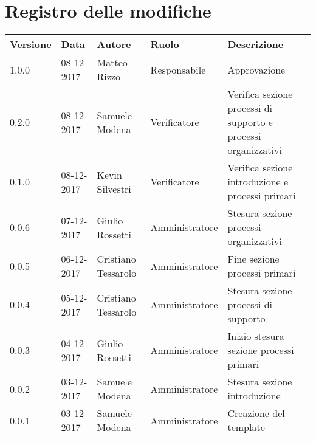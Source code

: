 \documentclass[./NormediProgetto.tex]{subfiles}
\begin{document}
\chapter*{Registro delle modifiche}
\setlength\LTleft{-22mm}
\begin{longtable}{|p{20mm}|p{20mm}|p{40mm}|p{30mm}|p{50mm}|}
	\hline
	\textbf{Versione} & \textbf{Data} & \textbf{Autore} & \textbf{Ruolo} & \textbf{Descrizione} \\ \hline 
		1.0.0 & 08-12-2017 & Matteo Rizzo & Responsabile & Approvazione\\ \hline
		0.2.0 & 08-12-2017 & Samuele Modena & Verificatore & Verifica sezione processi di supporto e processi organizzativi\\ \hline
		0.1.0 & 08-12-2017 & Kevin Silvestri & Verificatore & Verifica sezione introduzione e processi primari\\ \hline
		0.0.6 & 07-12-2017 & Giulio Rossetti & Amministratore & Stesura sezione processi organizzativi\\ \hline
		0.0.5 & 06-12-2017 & Cristiano Tessarolo & Amministratore & Fine sezione processi primari\\ \hline
		0.0.4 & 05-12-2017 & Cristiano Tessarolo & Amministratore & Stesura sezione processi di supporto\\ \hline
		0.0.3 & 04-12-2017 & Giulio Rossetti & Amministratore & Inizio stesura sezione processi primari\\ \hline
		0.0.2 & 03-12-2017 & Samuele Modena & Amministratore & Stesura sezione introduzione\\ \hline
		0.0.1 & 03-12-2017 & Samuele Modena & Amministratore & Creazione del template\\ \hline
\end{longtable}
\end{document}
